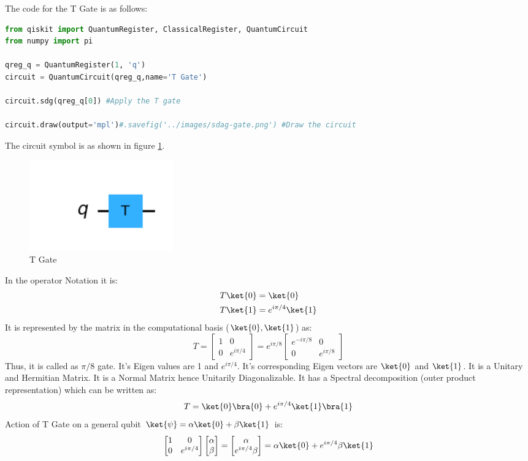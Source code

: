 \documentclass[12pt, oneside]{book}
\theoremstyle{definition}
\theoremstyle{definition}
\theoremstyle{remark}
\begin{document}
The code for the T Gate is as follows:
\begin{lstlisting}[language=Python]
from qiskit import QuantumRegister, ClassicalRegister, QuantumCircuit
from numpy import pi

qreg_q = QuantumRegister(1, 'q')
circuit = QuantumCircuit(qreg_q,name='T Gate')

circuit.sdg(qreg_q[0]) #Apply the T gate

circuit.draw(output='mpl')#.savefig('../images/sdag-gate.png') #Draw the circuit    
\end{lstlisting}

The circuit symbol is as shown in figure \ref{fig:t}.
\begin{figure}[H]
    \centering
    \includegraphics[width=0.3\textwidth]{../images/t-gate.png}
    \caption{T Gate}
    \label{fig:t}
\end{figure}

In the operator Notation it is:
\begin{align*}
    T\ket{0}&=\ket{0} \\
    T\ket{1}&=e^{i\pi/4}\ket{1}
\end{align*}
It is represented by the matrix in the computational basis ($\ket{0},\ket{1}$) as:
\[
    T=\begin{bmatrix}
        1 & 0 \\
        0 & e^{i\pi/4}
    \end{bmatrix}=e^{i\pi/8}\begin{bmatrix}
        e^{-i\pi/8} & 0 \\
        0 & e^{i\pi/8}
    \end{bmatrix}
\]
Thus, it is called as $\pi/8$ gate.
It's Eigen values are 1 and $e^{i\pi/4}$. It's corresponding Eigen vectors are $\ket{0}$ and $\ket{1}$.
It is a Unitary and Hermitian Matrix. It is a Normal Matrix hence Unitarily Diagonalizable.
It has a Spectral decomposition (outer product representation) which can be written as:
\[
    T=\ket{0}\bra{0}+e^{i\pi/4}\ket{1}\bra{1}
\]
Action of T Gate on a general qubit $\ket{\psi}=\alpha\ket{0}+\beta\ket{1}$ is:
\[
    \begin{bmatrix}
        1 & 0 \\
        0 & e^{i\pi/4}
    \end{bmatrix}\begin{bmatrix}
        \alpha \\
        \beta
    \end{bmatrix}=\begin{bmatrix}
        \alpha \\
        e^{i\pi/4}\beta
    \end{bmatrix}=\alpha\ket{0}+e^{i\pi/4}\beta\ket{1}
\]
\end{document}
